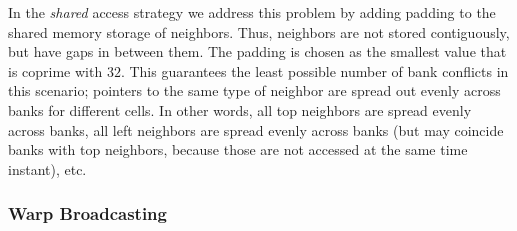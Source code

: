 In the \emph{shared} access strategy we address this problem by adding padding to the shared memory storage of neighbors. Thus, neighbors are not stored contiguously, but have gaps in between them. The padding is chosen as the smallest value that is coprime with $32$. This guarantees the least possible number of bank conflicts in this scenario; pointers to the same type of neighbor are spread out evenly across banks for different cells. In other words, all top neighbors are spread evenly across banks, all left neighbors are spread evenly across banks (but may coincide banks with top neighbors, because those are not accessed at the same time instant), etc.

\subsubsection{Warp Broadcasting}

